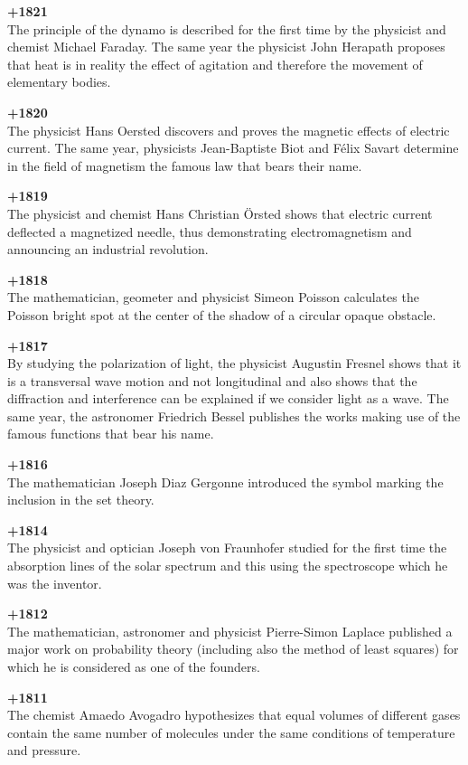\textbf{+1821}\\
The principle of the dynamo is described for the first time by the physicist and chemist Michael Faraday. The same year the physicist John Herapath proposes that heat is in reality the effect of agitation and therefore the movement of elementary bodies.

\textbf{+1820}\\
The physicist Hans Oersted discovers and proves the magnetic effects of electric current. The same year, physicists Jean-Baptiste Biot and Félix Savart determine in the field of magnetism the famous law that bears their name.

\textbf{+1819}\\
The physicist and chemist Hans Christian Örsted shows that electric current deflected a magnetized needle, thus demonstrating electromagnetism and announcing an industrial revolution.

\pagebreak
\textbf{+1818}\\
The mathematician, geometer and physicist Simeon Poisson calculates the Poisson bright spot at the center of the shadow of a circular opaque obstacle.

\textbf{+1817}\\
By studying the polarization of light, the physicist Augustin Fresnel shows that it is a transversal wave motion and not longitudinal and also shows that the diffraction and interference can be explained if we consider light as a wave. The same year, the astronomer Friedrich Bessel publishes the works making use of the famous functions that bear his name.

\textbf{+1816}\\
The mathematician Joseph Diaz Gergonne introduced the symbol marking the inclusion in the set theory.

\textbf{+1814}\\
The physicist and optician Joseph von Fraunhofer studied for the first time the absorption lines of the solar spectrum and this using the spectroscope which he was the inventor.

\textbf{+1812}\\
The mathematician, astronomer and physicist Pierre-Simon Laplace published a major work on probability theory (including also the method of least squares) for which he is considered as one of the founders.

\textbf{+1811}\\
The chemist Amaedo Avogadro hypothesizes that equal volumes of different gases contain the same number of molecules under the same conditions of temperature and pressure.

